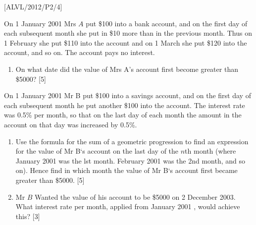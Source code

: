 \item {[}ALVL/2012/P2/4{]}

On 1 January 2001 Mrs $A$ put \$100 into a bank account, and on the
first day of each subsequent month she put in \$10 more than in the
previous month. Thus on 1 February she put \$110 into the account
and on 1 March she put \$120 into the account, and so on. The account
pays no interest.
\begin{enumerate}
\item On what date did the value of Mrs A's account first become greater
than \$5000? {[}5{]} 
\end{enumerate}
On 1 January 2001 Mr B put \$100 into a savings account, and on the
first day of each subsequent month he put another \$100 into the account.
The interest rate was 0.5\% per month, so that on the last day of
each month the amount in the account on that day was increased by
0.5\%. 
\begin{enumerate}
\item Use the formula for the sum of a geometric progression to find an
expression for the value of Mr B\textquoteleft s account on the last
day of the $n$th month (where January 2001 was the lst month. February
2001 was the 2nd month, and so on). Hence find in which month the
value of Mr B\textquoteleft s account first became greater than \$5000.
{[}5{]}
\item Mr $B$ Wanted the value of his account to be \$5000 on 2 December
2003. What interest rate per month, applied from January 2001 , would
achieve this? {[}3{]}
\end{enumerate}
